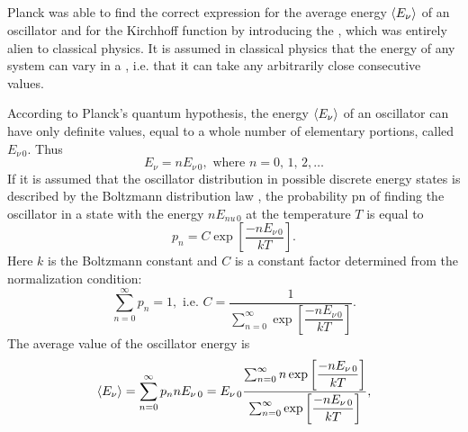 \subsection{}\label{36.3.2} Planck was able to find the correct expression for the average energy  $\expval{E_{\nu}}$ of an oscillator and for the Kirchhoff function by introducing the , which was entirely alien to classical physics. It is assumed in classical physics that the energy of any system can vary in a ,
i.e. that it can take any arbitrarily close consecutive values.

According to Planck's quantum hypothesis, the energy
$\expval{E_{\nu}}$ of an oscillator can have only definite  values, equal to a whole number of elementary portions, called  $E_{\nu \, 0}$. Thus
\begin{equation*}%
 E_{\nu} = n E_{\nu \, 0}, \text{ where } n = 0, \,1, \,2, \ldots{}
\end{equation*}
If it is assumed that the oscillator distribution in possible discrete energy states is described by the Boltzmann distribution law , the probability pn of finding the oscillator in a state with the energy $nE_{nu\, 0}$ at the temperature $T$ is equal to
\begin{equation*}%
p_{n} = C \exp \left[ \frac{-nE_{\nu\, 0}}{kT} \right].
\end{equation*}
Here $k$ is the Boltzmann constant  and $C$ is a constant factor determined from the normalization condition:
\begin{equation*}%
\sum_{n =0}^{\infty} p_{n} = 1, \text{ i.e. } C = \frac{1}{\sum_{n =0}^{\infty} \exp \left[ \dfrac{-nE_{\nu\, 0}}{kT} \right]}.
\end{equation*}
The average value of the oscillator energy is
\begin{equation*}%
\expval{E_{\nu}} = \sum_{n =0}^{\infty} p_{n} n E_{\nu\, 0} = E_{\nu\, 0} \frac{\sum_{n =0}^{\infty}n \exp \left[ \dfrac{-nE_{\nu\, 0}}{kT} \right]}{\sum_{n =0}^{\infty} \exp \left[ \dfrac{-nE_{\nu\, 0}}{kT} \right]},
\end{equation*}
